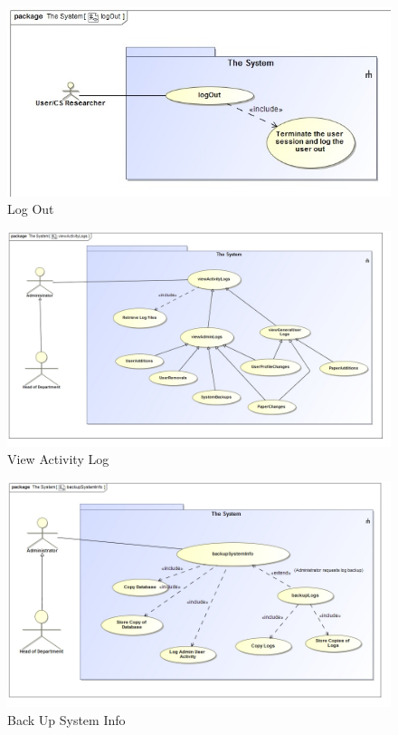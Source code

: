 \documentclass[a4paper,12pt]{article}
\begin{document}
\begin{figure}[H]
    \centering
    \caption{Log Out}
    \includegraphics[width=1\textwidth]{req-func/uc__The_System__logOut.jpg}
\end{figure}

\begin{figure}[H]
    \centering
    \caption{View Activity Log}
    \includegraphics[width=1\textwidth]{req-func/uc__The_System__viewActivityLogs.jpg}
\end{figure}

\begin{figure}[H]
    \centering
    \caption{Back Up System Info}
    \includegraphics[width=1\textwidth]{req-func/uc__The_System__backupSystemInfo.jpg}
\end{figure}
\end{document}
